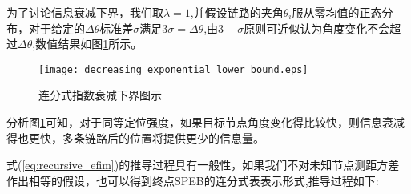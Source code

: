 为了讨论信息衰减下界，我们取$\lambda=1$,并假设链路的夹角$\theta_i$服从零均值的正态分布，对于给定的$\Delta \theta$标准差$\sigma$满足$3\sigma=\Delta \theta$,由$3-\sigma$原则可近似认为角度变化不会超过$\Delta \theta$,数值结果如图\ref{fig:continuous_fraction_exponential_lower_bound}所示。
    \begin{figure}
      \centering
      \texttt{[image: decreasing\_exponential\_lower\_bound.eps]}
      \caption{连分式指数衰减下界图示}\label{fig:continuous_fraction_exponential_lower_bound}
    \end{figure}

    分析图\ref{fig:continuous_fraction_exponential_lower_bound}可知，对于同等定位强度，如果目标节点角度变化得比较快，则信息衰减得也更快，多条链路后的位置将提供更少的信息量。



式(\ref{eq:recursive_efim})的推导过程具有一般性，如果我们不对未知节点测距方差作出相等的假设，也可以得到终点SPEB的连分式表表示形式,推导过程如下:

